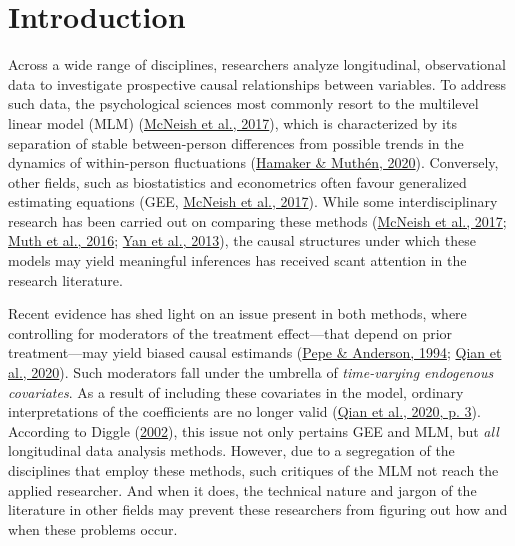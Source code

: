 \documentclass[
  12pt,
  a4paper,
]{article}
\begin{document}
\pagestyle{fancy}
  \fancyhead{}


\newpage

\hypertarget{introduction}{%
\section{Introduction}\label{introduction}}

Across a wide range of disciplines, researchers analyze longitudinal,
observational data to investigate prospective causal relationships
between variables. To address such data, the psychological sciences most
commonly resort to the multilevel linear model (MLM)
(\protect\hyperlink{ref-mcneish2017}{McNeish et al., 2017}), which is
characterized by its separation of stable between-person differences
from possible trends in the dynamics of within-person fluctuations
(\protect\hyperlink{ref-hamaker2020}{Hamaker \& Muthén, 2020}).
Conversely, other fields, such as biostatistics and econometrics often
favour generalized estimating equations (GEE,
\protect\hyperlink{ref-mcneish2017}{McNeish et al., 2017}). While some
interdisciplinary research has been carried out on comparing these
methods (\protect\hyperlink{ref-mcneish2017}{McNeish et al., 2017};
\protect\hyperlink{ref-muth2016}{Muth et al., 2016};
\protect\hyperlink{ref-yan2013}{Yan et al., 2013}), the causal
structures under which these models may yield meaningful inferences has
received scant attention in the research literature.

Recent evidence has shed light on an issue present in both methods,
where controlling for moderators of the treatment effect---that depend
on prior treatment---may yield biased causal estimands
(\protect\hyperlink{ref-pepe1994}{Pepe \& Anderson, 1994};
\protect\hyperlink{ref-qian2020}{Qian et al., 2020}). Such moderators
fall under the umbrella of \emph{time-varying endogenous covariates}. As
a result of including these covariates in the model, ordinary
interpretations of the coefficients are no longer valid
(\protect\hyperlink{ref-qian2020}{Qian et al., 2020, p. 3}). According
to Diggle (\protect\hyperlink{ref-diggle2002}{2002}), this issue not
only pertains GEE and MLM, but \emph{all} longitudinal data analysis
methods. However, due to a segregation of the disciplines that employ
these methods, such critiques of the MLM not reach the applied
researcher. And when it does, the technical nature and jargon of the
literature in other fields may prevent these researchers from figuring
out how and when these problems occur.
\end{document}
